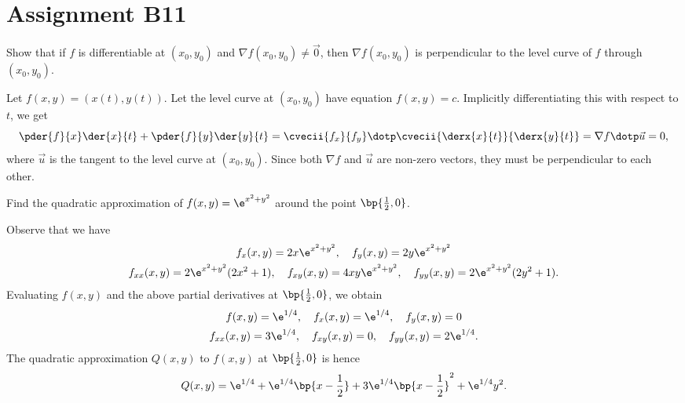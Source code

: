\section{Assignment B11}

\begin{problem}
    Show that if $f$ is differentiable at $(x_0, y_0)$ and $\nabla f(x_0, y_0) \neq \vec 0$, then $\nabla f(x_0, y_0)$ is perpendicular to the level curve of $f$ through $(x_0, y_0)$.
\end{problem}
\begin{solution}
    Let $f(x, y) = (x(t), y(t))$. Let the level curve at $(x_0, y_0)$ have equation $f(x, y) = c$. Implicitly differentiating this with respect to $t$, we get \[\pder{f}{x} \der{x}{t} + \pder{f}{y} \der{y}{t} = \cvecii{f_x}{f_y} \dotp \cvecii{\derx{x}{t}}{\derx{y}{t}} = \nabla f \dotp \vec u = 0,\] where $\vec u$ is the tangent to the level curve at $(x_0, y_0)$. Since both $\nabla f$ and $\vec u$ are non-zero vectors, they must be perpendicular to each other.
\end{solution}

\begin{problem}
    Find the quadratic approximation of $f(x, y) = \e^{x^2 + y^2}$ around the point $\bp{\frac12, 0}$.
\end{problem}
\begin{solution}
    Observe that we have
    \begin{gather*}
        f_x(x, y) = 2x\e^{x^2 + y^2}, \quad f_y(x, y) = 2y\e^{x^2 + y^2}\\
        f_{xx}(x, y) = 2\e^{x^2 + y^2}(2x^2 + 1), \quad f_{xy}(x, y) = 4xy\e^{x^2 + y^2}, \quad f_{yy}(x, y) = 2\e^{x^2 + y^2}(2y^2 + 1).
    \end{gather*}
    Evaluating $f(x, y)$ and the above partial derivatives at $\bp{\frac12, 0}$, we obtain
    \begin{gather*}
        f(x, y) = \e^{1/4}, \quad f_x(x, y) = \e^{1/4}, \quad f_y(x, y) = 0\\
        f_{xx}(x, y) = 3\e^{1/4}, \quad f_{xy}(x, y) = 0, \quad f_{yy}(x, y) = 2\e^{1/4}.
    \end{gather*}
    The quadratic approximation $Q(x, y)$ to $f(x, y)$ at $\bp{\frac12, 0}$ is hence \[Q(x, y) = \e^{1/4} + \e^{1/4}\bp{x - \frac12} + 3\e^{1/4} \bp{x - \frac12}^2 + \e^{1/4} y^2.\]
\end{solution}

